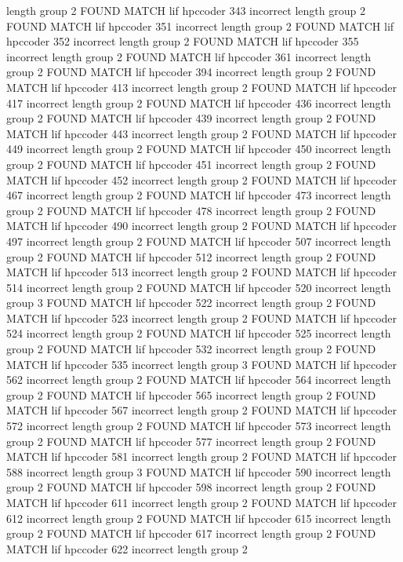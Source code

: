 length group  2
FOUND MATCH lif hpccoder 343 incorrect
length group  2
FOUND MATCH lif hpccoder 351 incorrect
length group  2
FOUND MATCH lif hpccoder 352 incorrect
length group  2
FOUND MATCH lif hpccoder 355 incorrect
length group  2
FOUND MATCH lif hpccoder 361 incorrect
length group  2
FOUND MATCH lif hpccoder 394 incorrect
length group  2
FOUND MATCH lif hpccoder 413 incorrect
length group  2
FOUND MATCH lif hpccoder 417 incorrect
length group  2
FOUND MATCH lif hpccoder 436 incorrect
length group  2
FOUND MATCH lif hpccoder 439 incorrect
length group  2
FOUND MATCH lif hpccoder 443 incorrect
length group  2
FOUND MATCH lif hpccoder 449 incorrect
length group  2
FOUND MATCH lif hpccoder 450 incorrect
length group  2
FOUND MATCH lif hpccoder 451 incorrect
length group  2
FOUND MATCH lif hpccoder 452 incorrect
length group  2
FOUND MATCH lif hpccoder 467 incorrect
length group  2
FOUND MATCH lif hpccoder 473 incorrect
length group  2
FOUND MATCH lif hpccoder 478 incorrect
length group  2
FOUND MATCH lif hpccoder 490 incorrect
length group  2
FOUND MATCH lif hpccoder 497 incorrect
length group  2
FOUND MATCH lif hpccoder 507 incorrect
length group  2
FOUND MATCH lif hpccoder 512 incorrect
length group  2
FOUND MATCH lif hpccoder 513 incorrect
length group  2
FOUND MATCH lif hpccoder 514 incorrect
length group  2
FOUND MATCH lif hpccoder 520 incorrect
length group  3
FOUND MATCH lif hpccoder 522 incorrect
length group  2
FOUND MATCH lif hpccoder 523 incorrect
length group  2
FOUND MATCH lif hpccoder 524 incorrect
length group  2
FOUND MATCH lif hpccoder 525 incorrect
length group  2
FOUND MATCH lif hpccoder 532 incorrect
length group  2
FOUND MATCH lif hpccoder 535 incorrect
length group  3
FOUND MATCH lif hpccoder 562 incorrect
length group  2
FOUND MATCH lif hpccoder 564 incorrect
length group  2
FOUND MATCH lif hpccoder 565 incorrect
length group  2
FOUND MATCH lif hpccoder 567 incorrect
length group  2
FOUND MATCH lif hpccoder 572 incorrect
length group  2
FOUND MATCH lif hpccoder 573 incorrect
length group  2
FOUND MATCH lif hpccoder 577 incorrect
length group  2
FOUND MATCH lif hpccoder 581 incorrect
length group  2
FOUND MATCH lif hpccoder 588 incorrect
length group  3
FOUND MATCH lif hpccoder 590 incorrect
length group  2
FOUND MATCH lif hpccoder 598 incorrect
length group  2
FOUND MATCH lif hpccoder 611 incorrect
length group  2
FOUND MATCH lif hpccoder 612 incorrect
length group  2
FOUND MATCH lif hpccoder 615 incorrect
length group  2
FOUND MATCH lif hpccoder 617 incorrect
length group  2
FOUND MATCH lif hpccoder 622 incorrect
length group  2
